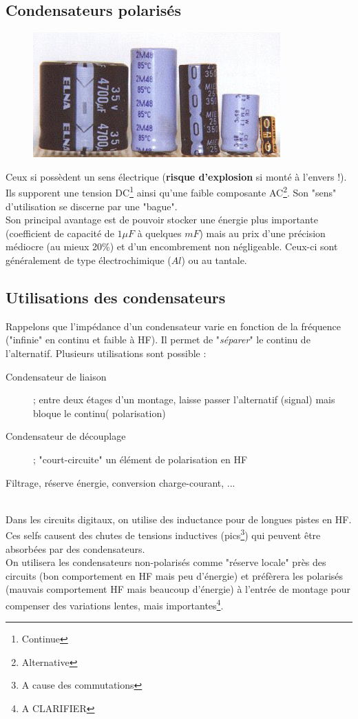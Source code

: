 \documentclass	[11pt, a4paper, openany]{book}
\begin{document}
\subsection{Condensateurs polarisés}
\begin{figure}
\includegraphics[scale=0.2]{img/image34}
\end{figure}
Ceux si possèdent un sens électrique (\textbf{risque d'explosion} si monté à l'envers !). Ils supporent une tension DC\footnote{Continue} ainsi qu'une faible composante AC\footnote{Alternative}. Son "sens" d'utilisation se discerne par une "bague".\\

Son principal avantage est de pouvoir stocker une énergie plus importante (coefficient de capacité de $1\mu F$ à quelques $mF$) mais au prix d'une précision médiocre (au mieux 20\%) et d'un encombrement non négligeable. Ceux-ci sont généralement de type électrochimique ($Al$) ou au tantale.


\subsection{Utilisations des condensateurs}
Rappelons que l'impédance d'un condensateur varie en fonction de la fréquence ("infinie" en continu et faible à HF). Il permet de "\textit{séparer}" le continu de l'alternatif. Plusieurs utilisations sont possible :
\begin{description}
\item[Condensateur de liaison]; entre deux étages d'un montage, laisse passer l'alternatif (signal) mais bloque le continu( polarisation)
\item[Condensateur de découplage ]; "court-circuite" un élément de polarisation en HF
\item[Filtrage, réserve énergie, conversion charge-courant, ...]
\end{description}\ \\
Dans les circuits digitaux, on utilise des inductance pour de longues pistes en HF. Ces selfs causent des chutes de tensions inductives (pics\footnote{A cause des commutations}) qui peuvent être absorbées par des condensateurs.\\
On utilisera les condensateurs non-polarisés comme "réserve locale" près des circuits (bon comportement en HF mais peu d'énergie) et préfèrera les polarisés (mauvais comportement HF mais beaucoup d'énergie) à l'entrée de montage pour compenser des variations lentes, mais importantes\footnote{A CLARIFIER}.
\end{document}
